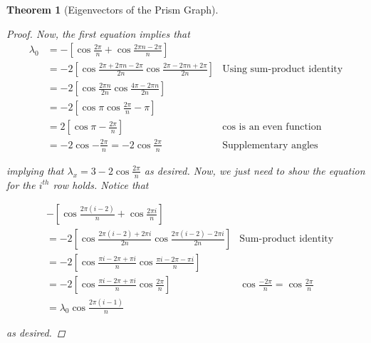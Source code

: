 \documentclass[11pt]{report}
\newtheorem{theorem}{Theorem}[section]
\begin{document}
\begin{theorem}[Eigenvectors of the Prism Graph]
\begin{proof}
        Now, the first equation implies that 
        \[\begin{aligned}
        \lambda_0
        &= -\left[
        \cos{\frac{2\pi}{n}} + \cos{\frac{2\pi n - 2\pi}{n}}   
        \right] \\
        &= -2\left[
        \cos{ \frac{
                2 \pi + 2\pi n - 2\pi    
            }{ 2n } }
        \cos{ \frac{
                2\pi - 2\pi n + 2\pi
            }{ 2n }
        } \right]
        &\text{Using sum-product identity} \\
        &= -2\left[
        \cos{ \frac{2 \pi n}{2n} } \cos{\frac{ 4\pi - 2\pi n }{2n} }
        \right] \\
        &= -2\left[
        \cos{ \pi } \cos{ \frac{ 2\pi}{n} - \pi }
        \right] \\
        &= 2\left[
        \cos{ \pi - \frac{ 2\pi}{n}} \right]
        &\text{cos is an even function} \\
        &= -2\cos{ - \frac{ 2\pi}{n} }
        = -2\cos{ \frac{ 2\pi}{n} }
        &\text{Supplementary angles}
        \end{aligned}\]
        
        implying that $\lambda_x = 3 - 2\cos{\frac{2\pi}{n}}$ as desired. Now, we just need to show the equation for the $i^{th}$ row holds. Notice that
        
        \[
        \begin{aligned}
        &-\left[\cos{\frac{2 \pi (i - 2)}{n}} + \cos{\frac{2 \pi i}{n}}\right] \\
        &= -2\left[
        \cos{ \frac{2\pi(i - 2) + 2\pi i}{2n} }
        \cos{ \frac{2\pi(i - 2) - 2\pi i}{2n} }
        \right]
        &\text{Sum-product identity} \\
        &= -2\left[
        \cos{ \frac{\pi i - 2\pi + \pi i}{n} }
        \cos{ \frac{\pi i - 2\pi - \pi i}{n} }
        \right] \\
        &= -2\left[
        \cos{ \frac{\pi i - 2\pi + \pi i}{n} }
        \cos{ \frac{2\pi}{n} }
        \right]
        &\cos{ \frac{-2\pi}{n} } = \cos{ \frac{2\pi}{n} } \\
        &= \lambda_0 \cos{ \frac{2\pi(i - 1)}{n} }
        \end{aligned}
        \]
        
        as desired.
        
        \bigskip
        

\end{proof}
\end{theorem}
\end{document}
